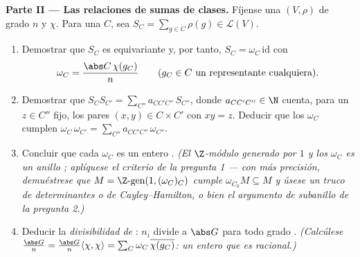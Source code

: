 \begin{problem}
\medskip
\noindent\textbf{Parte II --- Las relaciones de sumas de clases.}
Fíjense una $(V, \rho)$ 
de grado $n$ y 
$\chi$. Para una 
$C$, sea $S_C = \sum_{g \in C}\rho(g) \in
\mathcal L(V)$.
\begin{enumerate}[resume]
  \item Demostrar que $S_C$ es equivariante y, por tanto, $S_C =
        \omega_C\,\mathrm{id}$ con
        \[
        \omega_C = \frac{\abs C\,\chi(g_C)}{n}
        \qquad (g_C \in C \text{ un representante cualquiera}).
        \]
  \item Demostrar que $S_CS_{C'} = \sum_{C''}
        a_{CC'C''}\,S_{C''}$, donde $a_{CC'C''} \in \N$ cuenta, para un
  $z \in C''$ fijo, los pares $(x, y) \in C \times
        C'$ con $xy = z$. Deducir que los $\omega_C$ cumplen
        $\omega_C\,\omega_{C'} = \sum_{C''}
        a_{CC'C''}\,\omega_{C''}$.
  \item Concluir que cada $\omega_C$ es un entero
  . \emph{(El $\Z$-módulo
  generado por $1$ y los $\omega_C$ es un anillo
  ; aplíquese el
  criterio de la pregunta 1 --- con más precisión, demuéstrese que
  $M = \Z\text{-gen}
        (1, (\omega_C)_C)$ cumple $\omega_{C_0} M \subseteq
        M$ y úsese un truco de determinantes o de Cayley--Hamilton, o
  bien el argumento de subanillo de la pregunta 2.)} \item Deducir la
  \emph{divisibilidad de
  }: $n_i$ divide a
  $\abs G$ para todo grado
  . \emph{(Calcúlese
  $\frac{\abs G}{n} = \frac{\abs G}{n}
        \langle\chi,\chi\rangle = \sum_C \omega_C\,
        \overline{\chi(g_C)}$: un entero
   que es racional.)}
\end{enumerate}


\end{problem}

